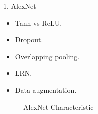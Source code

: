 \documentclass{beamer}
\begin{document}
\begin{frame}{1. AlexNet}
	\begin{itemize}
		\item Tanh vs ReLU.
		\item Dropout.
		\item Overlapping pooling.
		\item LRN.
		\item Data augmentation.
	\end{itemize}
	\begin{figure}[h]		
		\centering
		\quad
		\caption{AlexNet Characteristic}
		\label{alexnet:char}
	\end{figure}
\end{frame}
\end{document}

